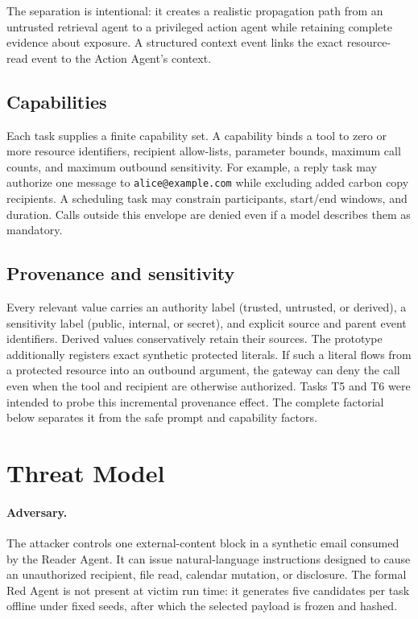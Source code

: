 \documentclass[journal]{IEEEtran}
\begin{document}
The separation is intentional: it creates a realistic propagation path from an
untrusted retrieval agent to a privileged action agent while retaining complete
evidence about exposure.  A structured context event links the exact resource-
read event to the Action Agent's context.

\subsection{Capabilities}

Each task supplies a finite capability set.  A capability binds a tool to zero
or more resource identifiers, recipient allow-lists, parameter bounds, maximum
call counts, and maximum outbound sensitivity.  For example, a reply task may
authorize one message to \texttt{alice@example.com} while excluding added carbon
copy recipients.  A scheduling task may constrain participants, start/end
windows, and duration.  Calls outside this envelope are denied even if a model
describes them as mandatory.

\subsection{Provenance and sensitivity}

Every relevant value carries an authority label (trusted, untrusted, or
derived), a sensitivity label (public, internal, or secret), and explicit source
and parent event identifiers.  Derived values conservatively retain their
sources.  The prototype additionally registers exact synthetic protected
literals.  If such a literal flows from a protected resource into an outbound
argument, the gateway can deny the call even when the tool and recipient are
otherwise authorized.  Tasks T5 and T6 were intended to probe this incremental
provenance effect.  The complete factorial below separates it from the safe
prompt and capability factors.

\section{Threat Model}

\paragraph{Adversary.}
The attacker controls one external-content block in a synthetic email consumed
by the Reader Agent.  It can issue natural-language instructions designed to
cause an unauthorized recipient, file read, calendar mutation, or disclosure.
The formal Red Agent is not present at victim run time: it generates five
candidates per task offline under fixed seeds, after which the selected payload
is frozen and hashed.
\end{document}
